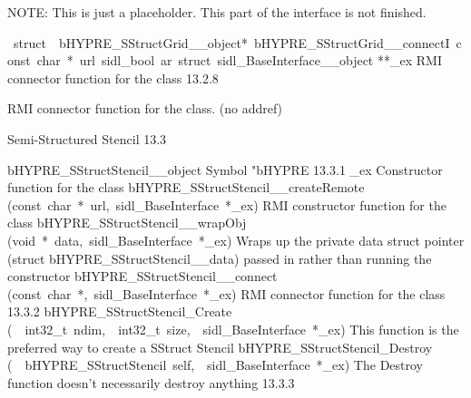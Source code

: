 \documentclass{article}
\begin{document}
\begin{cxxentry}
\begin{cxxentry}
\begin{cxxfunction}
\begin{cxxdoc}
NOTE: This is just a placeholder.  This part of the interface
is not finished.
\end{cxxdoc}
\end{cxxfunction}
\begin{cxxvariable}
{\ struct\ \ bHYPRE\_SStructGrid\_\_object*\ bHYPRE\_SStructGrid\_\_connectI\ const\ char\ *\ url\ sidl\_bool\ ar\ struct\ sidl\_BaseInterface\_\_object}
        {**\_ex}
        {}
        {
RMI connector function for the class}
        {13.2.8}
\begin{cxxdoc}

RMI connector function for the class. (no addref)
\end{cxxdoc}
\end{cxxvariable}
\end{cxxentry}
\begin{cxxentry}
{}
        {Semi-Structured Stencil}
        {}
        {
}
        {13.3}
\begin{cxxnames}
        {bHYPRE\_SStructStencil\_\_object}
        {}
        {
Symbol "bHYPRE}
        {13.3.1}
        {\_ex}
        {}
        {
Constructor function for the class}
        {}
\label{cxx.13.3.6}
        {bHYPRE\_SStructStencil\_\_createRemote}
        {(const\ char\ *\ url,\ sidl\_BaseInterface\ *\_ex)}
        {
RMI constructor function for the class}
        {}
\label{cxx.13.3.7}
        {bHYPRE\_SStructStencil\_\_wrapObj}
        {(void\ *\ data,\ sidl\_BaseInterface\ *\_ex)}
        {
Wraps up the private data struct pointer (struct bHYPRE\_SStructStencil\_\_data) passed in rather than running the constructor}
        {}
\label{cxx.13.3.8}
        {bHYPRE\_SStructStencil\_\_connect}
        {(const\ char\ *,\ sidl\_BaseInterface\ *\_ex)}
        {
RMI connector function for the class}
        {13.3.2}
        {bHYPRE\_SStructStencil\_Create}
        {(\ \ int32\_t\ ndim,\ \ int32\_t\ size,\ \ sidl\_BaseInterface\ *\_ex)}
        {
This function is the preferred way to create a SStruct Stencil}
        {}
\label{cxx.13.3.9}
        {bHYPRE\_SStructStencil\_Destroy}
        {(\ \ bHYPRE\_SStructStencil\ self,\ \ sidl\_BaseInterface\ *\_ex)}
        {
The Destroy function doesn't necessarily destroy anything}
        {13.3.3}

\end{cxxnames}
\end{cxxentry}
\end{cxxentry}
\end{document}
